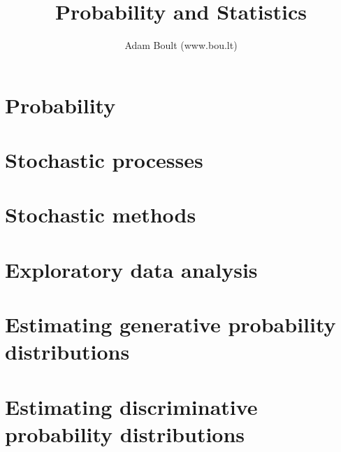 \documentclass[oneside]{book}
\begin{document}
\author{Adam Boult (www.bou.lt)}
\title{Probability and Statistics}
\maketitle

\setcounter{tocdepth}{1}
\tableofcontents



\part{Probability}












\part{Stochastic processes}





\part{Stochastic methods}




\part{Exploratory data analysis}










\part{Estimating generative probability distributions}












\part{Estimating discriminative probability distributions}




\end{document}
